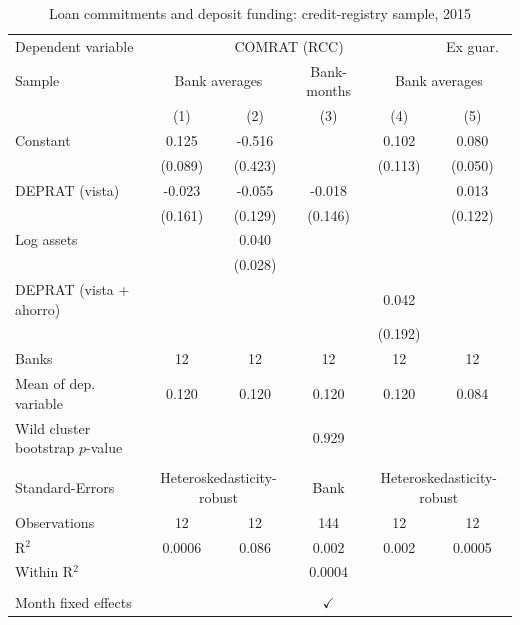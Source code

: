
\begin{table}[!h]
   \centering
   \small
   \begin{threeparttable}[b]
      \caption{\label{tab:krs_rcc_2015} Loan commitments and deposit funding: credit-registry sample, 2015}
      \bigskip
      \begin{tabular}{lccccc}
         \toprule
         Dependent variable & \multicolumn{4}{c}{COMRAT (RCC)} & Ex guar. \\ 
         Sample & \multicolumn{2}{c}{Bank averages} & Bank-months & \multicolumn{2}{c}{Bank averages} \\ 
                                          & (1)     & (2)     & (3)           & (4)     & (5)\\  
         \midrule 
         Constant                         & 0.125   & -0.516  &               & 0.102   & 0.080\\   
                                          & (0.089) & (0.423) &               & (0.113) & (0.050)\\   
         DEPRAT (vista)                   & -0.023  & -0.055  & -0.018        &         & 0.013\\   
                                          & (0.161) & (0.129) & (0.146)       &         & (0.122)\\   
         Log assets                       &         & 0.040   &               &         &   \\   
                                          &         & (0.028) &               &         &   \\   
         DEPRAT (vista + ahorro)          &         &         &               & 0.042   &   \\   
                                          &         &         &               & (0.192) &   \\   
         Banks                            & 12      & 12      & 12            & 12      & 12\\  
         Mean of dep. variable            & 0.120   & 0.120   & 0.120         & 0.120   & 0.084\\  
         Wild cluster bootstrap $p$-value &         &         & 0.929         &         & \\  
          \\
         Standard-Errors & \multicolumn{2}{c}{Heteroskedasticity-robust} & Bank & \multicolumn{2}{c}{Heteroskedasticity-robust} \\ 
         Observations                     & 12      & 12      & 144           & 12      & 12\\  
         R$^2$                            & 0.0006  & 0.086   & 0.002         & 0.002   & 0.0005\\  
         Within R$^2$                     &         &         & 0.0004        &         & \\  
          \\
         Month fixed effects              &         &         & $\checkmark$  &         & \\  
         \bottomrule
      \end{tabular}
      

\end{threeparttable}
\end{table}
